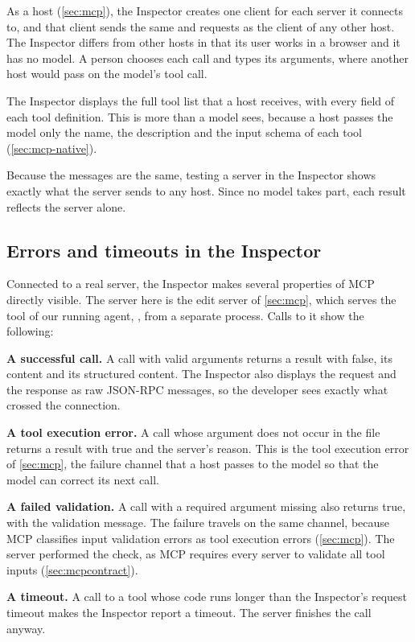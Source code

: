As a host (\cref{sec:mcp}), the Inspector creates one client for each server it connects to, and
that client sends the same  and  requests as the client of
any other host. The Inspector differs from other hosts in that its user works in a browser and it
has no model. A person chooses each call and types its arguments, where another host would pass on
the model's tool call.

The Inspector displays the full tool list that a host receives, with every field of each tool
definition. This is more than a model sees, because a host passes the model only the name, the
description and the input schema of each tool (\cref{sec:mcp-native}).

Because the messages are the same, testing a server in the Inspector shows exactly what the server
sends to any host. Since no model takes part, each result reflects the server alone.

\subsection{Errors and timeouts in the Inspector}
\label{sec:inspector-errors}

Connected to a real server, the Inspector makes several properties of MCP directly visible. The
server here is the edit server of \cref{sec:mcp}, which serves the  tool of our
running agent, \msa{}, from a separate process. Calls to it show the following:
\bi
\item \textbf{A successful call.} A call with valid arguments returns a result with
 false, its content and its structured content. The Inspector also displays the
request and the response as raw JSON-RPC messages, so the developer sees exactly what crossed the
connection.
\item \textbf{A tool execution error.} A call whose  argument does not occur in the
file returns a result with  true and the server's reason. This is the tool
execution error of \cref{sec:mcp}, the failure channel that a host passes to the model so that the
model can correct its next call.
\item \textbf{A failed validation.} A call with a required argument missing also returns
 true, with the validation message. The failure travels on the same channel,
because MCP classifies input validation errors as tool execution errors (\cref{sec:mcp}). The
server performed the check, as MCP requires every server to validate all tool inputs
(\cref{sec:mcpcontract}).
\item \textbf{A timeout.} A call to a tool whose code runs longer than the Inspector's request
timeout makes the Inspector report a timeout. The server finishes the call anyway.
\ei


